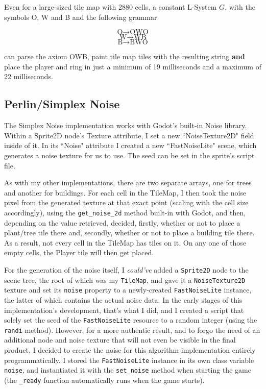 Even for a large-sized tile map with 2880 cells, a constant L-System $G$, with the symbols O, W and B and the following grammar

$$ \mbox{O} \rightarrow \mbox{O}\mbox{W}\mbox{O} $$
$$ \mbox{W} \rightarrow \mbox{W}\mbox{B} $$
$$ \mbox{B} \rightarrow \mbox{B}\mbox{W}\mbox{O} $$

can parse the axiom OWB, paint tile map tiles with the resulting string \textbf{and} place the player and ring in just a minimum of 19 milliseconds and a maximum of 22 milliseconds.

\subsection{Perlin/Simplex Noise}

The Simplex Noise implementation works with Godot's built-in Noise library. Within a Sprite2D node's Texture attribute, I set a new ``NoiseTexture2D" field inside of it. In its ``Noise" attribute I created a new ``FastNoiseLite" scene, which generates a noise texture for us to use. The seed can be set in the sprite's script file.

As with my other implementations, there are two separate arrays, one for trees and another for buildings. For each cell in the TileMap, I then took the noise pixel from the generated texture at that exact point (scaling with the cell size accordingly), using the \verb|get_noise_2d| method built-in with Godot, and then, depending on the value retrieved, decided, firstly, whether or not to place a plant/tree tile there and, secondly, whether or not to place a building tile there. As a result, not every cell in the TileMap has tiles on it. On any one of those empty cells, the Player tile will then get placed.

For the generation of the noise itself, I \textit{could've} added a \verb|Sprite2D| node to the scene tree, the root of which was my \verb|TileMap|, and gave it a \verb|NoiseTexture2D| texture and set its \verb|noise| property to a newly-created \verb|FastNoiseLite| instance, the latter of which contains the actual noise data. In the early stages of this implementation's development, that's what I did, and I created a script that solely set the seed of the \verb|FastNoiseLite| resource to a random integer (using the \verb|randi| method). However, for a more authentic result, and to forgo the need of an additional node and noise texture that will not even be visible in the final product, I decided to create the noise for this algorithm implementation entirely programmatically. I stored the \verb|FastNoiseLite| instance in its own class variable \verb|noise|, and instantiated it with the \verb|set_noise| method when starting the game (the \verb|_ready| function automatically runs when the game starts).

